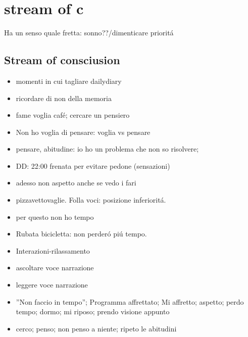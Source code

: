 {\let\clearpage\relax\let\newpage\relax
\chapter{stream of c}
}
\listofkeywords

Ha un senso quale fretta: sonno??/dimenticare priorit\'a

\section{Stream of consciusion}


\begin{itemize}

\item momenti in cui tagliare dailydiary

\item ricordare di non  della memoria

\item fame voglia caf\'e; cercare un pensiero

\item Non ho voglia di pensare: voglia vs pensare

\item pensare, abitudine: io ho un problema che non so risolvere;

\item DD: 22:00 frenata per evitare pedone (sensazioni)

\item adesso non aspetto anche se vedo i fari

\item pizzavettovaglie. Folla voci: posizione inferiorit\'a.

\item per questo non ho tempo

\item Rubata bicicletta: non perder\'o pi\'u tempo.

\item Interazioni-rilassamento

\item ascoltare voce narrazione

\item leggere voce narrazione

\item ''Non faccio in tempo''; Programma affrettato; Mi affretto; aspetto; perdo tempo; dormo; mi riposo; prendo visione appunto

\item cerco; penso; non penso a niente; ripeto le abitudini


\end{itemize}
